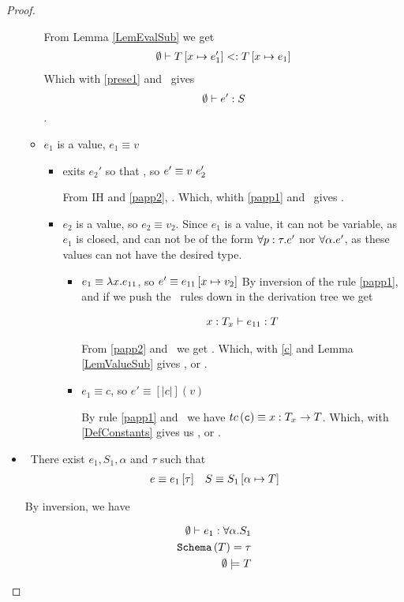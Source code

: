 \begin{proof}
\begin{itemize}
\begin{itemize}
From Lemma \ref{LemEvalSub} we get 
\begin{align*}
{\emptyset}\vdash {T\ensuremath{\left[ x \mapsto e_1' \right]}}<:{T\left[ x \mapsto e_1 \right]}
\end{align*}
Which with \ref{prese1} and \tsub\ gives
$${\emptyset}\vdash {e'}:{S}$$.
	\item $e_1$ is a value, $e_1 \equiv v$
	\begin{itemize}
		\item exits $e_2'$ so that , so $e' \equiv {v} \ {e_2'}$
		
		From IH and \ref{papp2}, . 
		Which, whith \ref{papp1} and \tapp\ gives .
		\item $e_2$ is a value, so $e_2 \equiv v_2$.
		Since $e_1$ is a value, it can not be variable, as $e_1$ is closed,
		and can not be of the form $\forall p : \tau . e'$ nor $\forall \alpha . e'$,
		as these values can not have the desired type. 
		\begin{itemize}
			\item $e_1 \equiv \lambda x . e_{11}$, so $e' \equiv e_{11}\left[ x \mapsto v_2 \right]$
			By inversion of the rule \ref{papp1}, and if we push the \tsub \ rules down in the derivation tree we get
			 
			\begin{align}
			{x:T_x}\vdash {e_{11}}:{T} \label{c}
			\end{align}
			
			From  \ref{papp2} and \wsExt \ we get .
			Which, with \ref{c} and Lemma \ref{LemValueSub} gives 
			, or  
			.  
			\item $e_1 \equiv c$, so $e' \equiv [|c|](v)$
			
			By rule \ref{papp1} and \tcon \ we have 
			$tc\left(\texttt{c}\right) \equiv x : T_x \rightarrow T$.
			Which, with \ref{DefConstants} gives us 
			, or 
			. 
		\end{itemize}
	\end{itemize}
\end{itemize}
\item \tinst\ There exist $e_1, S_1, \alpha$ and $\tau$ such that
\begin{align*}
e \equiv {e_1} \left[ {\tau}\right] && S \equiv S_1\left[ \alpha \mapsto T \right]
\end{align*}

By inversion, we have

\begin{align}
{\emptyset}\vdash {e_1}:{\forall \alpha . S_1} \label{d1}\\
\texttt{Schema}\left(T\right) = \tau \label{e1}\\
{\emptyset}\models {T} \label{f}
\end{align} 


\end{itemize}
\end{proof}
